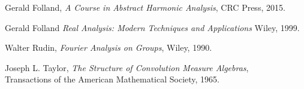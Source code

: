 \documentclass{article}
\theoremstyle{plain}
\theoremstyle{definition}
\begin{document}
\begin{thebibliography}{9}

    Gerald Folland,
    \emph{A Course in Abstract Harmonic Analysis},
    CRC Press,
    2015.

    Gerald Folland
    \emph{Real Analysis: Modern Techniques and Applications}
    Wiley,
    1999.

    Walter Rudin,
    \emph{Fourier Analysis on Groups},
    Wiley,
    1990.

    Joseph L. Taylor,
    \emph{The Structure of Convolution Measure Algebras},\\
    Transactions of the American Mathematical Society,
    1965.

\end{thebibliography}
\end{document}
